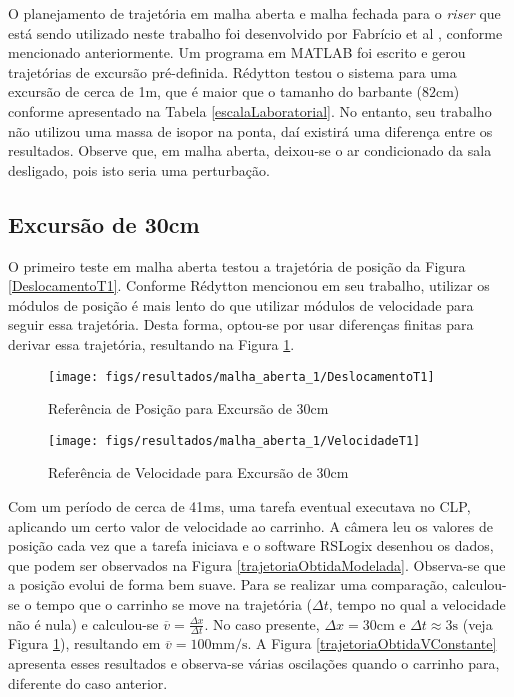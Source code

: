 O planejamento de trajetória em malha aberta e malha fechada para o \textit{riser} que está sendo utilizado neste trabalho foi desenvolvido por Fabrício et al \cite{fabricioIFAC}, conforme mencionado anteriormente. Um programa em MATLAB foi escrito e gerou trajetórias de excursão pré-definida. Rédytton \cite{redytton} testou o sistema para uma excursão de cerca de 1m, que é maior que o tamanho do barbante ($82\mathrm{cm}$) conforme apresentado na Tabela \ref{escalaLaboratorial}. No entanto, seu trabalho não utilizou uma massa de isopor na ponta, daí existirá uma diferença entre os resultados. Observe que, em malha aberta, deixou-se o ar condicionado da sala desligado, pois isto seria uma perturbação.

\subsection{Excursão de 30cm}
O primeiro teste em malha aberta testou a trajetória de posição da Figura \ref{DeslocamentoT1}. Conforme Rédytton \cite{redytton} mencionou em seu trabalho, utilizar os módulos de posição é mais lento do que utilizar módulos de velocidade para seguir essa trajetória. Desta forma, optou-se por usar diferenças finitas para derivar essa trajetória, resultando na Figura \ref{VelocidadeT1}. 

\begin{figure}[!htb]
    \centering
    \begin{minipage}{.45\textwidth}
        \centering
        \texttt{[image: figs/resultados/malha\_aberta\_1/DeslocamentoT1]}
        \caption{Referência de Posição para Excursão de 30cm}
        \label{DeslocamentoT1}
    \end{minipage}%
    \hspace{0.1cm}
    \begin{minipage}{0.45\textwidth}
        \centering
        \texttt{[image: figs/resultados/malha\_aberta\_1/VelocidadeT1]}
        \caption{Referência de Velocidade para Excursão de 30cm}
        \label{VelocidadeT1}
    \end{minipage}
\end{figure}

Com um período de cerca de 41ms, uma tarefa eventual executava no CLP, aplicando um certo valor de velocidade ao carrinho. A câmera leu os valores de posição cada vez que a tarefa iniciava e o software RSLogix desenhou os dados, que podem ser observados na Figura \ref{trajetoriaObtidaModelada}. Observa-se que a posição evolui de forma bem suave. Para se realizar uma comparação, calculou-se o tempo que o carrinho se move na trajetória ($\Delta t$, tempo no qual a velocidade não é nula) e calculou-se $\overline{v} = \frac{\Delta x}{\Delta t}$. No caso presente, $\Delta x = 30\mathrm{cm}$ e $\Delta t \approx 3\mathrm{s}$ (veja Figura \ref{VelocidadeT1}), resultando em $\overline{v} = 100\mathrm{mm}/\mathrm{s}$. A Figura \ref{trajetoriaObtidaVConstante} apresenta esses resultados e observa-se várias oscilações quando o carrinho para, diferente do caso anterior.

